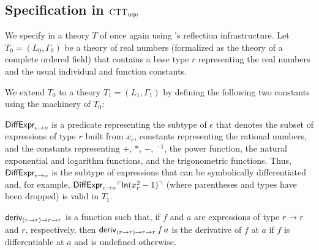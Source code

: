 \documentclass[fleqn]{llncs}
\begin{document}
\subsection{Specification in ${\rm CTT}_{\rm uqe}$}

We specify  in a theory $T$ of {\churchuqe} once again
using {\churchuqe}'s reflection infrastructure.  Let $T_0 =
(L_0,\Gamma_0)$ be a theory of real numbers (formalized as the theory
of a complete ordered field) that contains a base type $r$
representing the real numbers and the usual individual and function
constants.

We extend $T_0$ to a theory $T_1 = (L_1,\Gamma_1)$ by defining the
following two constants using the machinery of $T_0$:

\be

  \item $\mbox{\sf DiffExpr}_{\epsilon \rightarrow o}$ is a predicate
    representing the subtype of $\epsilon$ that denotes the subset of
    expressions of type $r$ built from $x_r$, constants representing
    the rational numbers, and the constants representing $+$, $*$,
    $-$, $\phantom{}^{-1}$, the power function, the natural
    exponential and logarithm functions, and the trigonometric
    functions.  Thus, $\mbox{\sf DiffExpr}_{\epsilon \rightarrow o}$ is the
    subtype of expressions that can be symbolically differentiated
    and, for example, $\mbox{\sf DiffExpr}_{\epsilon \rightarrow o} \,
    \ulcorner\mbox{\sf ln}(x^{2}_{r} - 1)\urcorner$ (where parentheses and types
    have been dropped) is valid in $T_1$.

  \item $\mbox{\sf deriv}_{(r \rightarrow r) \rightarrow r \rightarrow r}$ is a
    function such that, if $f$ and $a$ are expressions of type $r
    \rightarrow r$ and $r$, respectively, then $\mbox{\sf deriv}_{(r \rightarrow
      r) \rightarrow r \rightarrow r} \, f \, a$ is the derivative of $f$ at
    $a$ if $f$ is differentiable at $a$ and is undefined otherwise.

\ee
\end{document}
